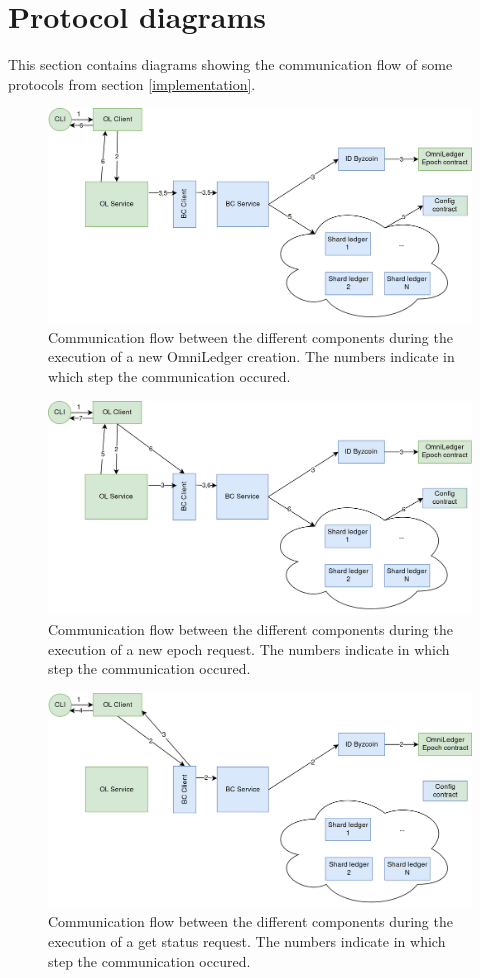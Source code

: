 \newpage
\appendix
\section{Protocol diagrams}
This section contains diagrams showing the communication flow of some protocols from section \ref{implementation}.

\begin{figure}[H]
	\centering
	\includegraphics[width=\textwidth]{ol_creation.png}
	\caption{\label{fig:ol-creation} Communication flow between the different components during the execution of a new OmniLedger creation. The numbers indicate in which step the communication occured.}
\end{figure}

\begin{figure}[H]
	\centering
	\includegraphics[width=\textwidth]{newepoch.png}
	\caption{\label{fig:newepoch} Communication flow between the different components during the execution of a new epoch request. The numbers indicate in which step the communication occured.}
\end{figure}

\begin{figure}[H]
	\centering
	\includegraphics[width=\textwidth]{getstatus.png}
	\caption{\label{fig:getstatus} Communication flow between the different components during the execution of a get status request. The numbers indicate in which step the communication occured.}
\end{figure}

